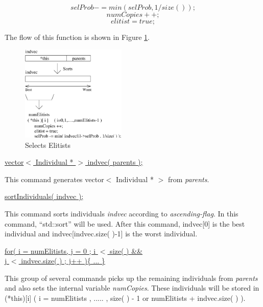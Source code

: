 \documentclass[twocolumn]{article}
\begin{document}
\begin{equation}
selProb -= min( selProb, 1/size( ) );
\end{equation}
\begin{equation}
numCopies ++;
\end{equation}
\begin{equation}
elitist = true;
\end{equation}

\noindent
The flow of this function is shown in Figure \ref{SelectElitist}.

\begin{figure}[h]
\begin{center}
\includegraphics[width = 5cm]{selectElitists.eps}
\caption{Selects Elitists}
\label{SelectElitist}
\end{center}
\end{figure}

\vspace*{2mm}

\noindent
\underline{vector$<$ Individual * $>$ indvec( parents );}

\noindent
This command generates vector$<$ Individual * $>$ from {\em parents}.

\vspace*{2mm}

\noindent
\underline{sortIndividuals( indvec );}

\noindent
This command sorts individuals {\em indvec} according to {\em
ascending-flag}. In this command, ``std::sort'' will be used. After
this command, indvec[0] is the best individual and
indvec[indvec.size( )-1] is the worst individual.

\vspace*{2mm}

\noindent
\underline{for( i = numElitists, j = 0 ; i $<$ size( ) \&\&} \\
\underline{ j $<$ indvec.size( ) ; j++ )\{ ... \}} 

\noindent
This group of several commands picks up the remaining individuals from {\em
parents} and also sets the internal variable {\em numCopies}. These
individuals will be stored in (*this)[i] ( i = numElitists , ..... , size(
) - 1 or numElitists + indvec.size( ) ).
\end{document}

